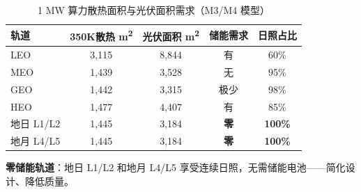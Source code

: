 \begin{table}[H]
\centering
\caption{1 MW 算力散热面积与光伏面积需求（M3/M4 模型）}
\label{tab:area-requirement}
\small
\begin{tabular}{@{}lcccc@{}}
\toprule
\textbf{轨道} & \textbf{350K散热 m\textsuperscript{2}} & \textbf{光伏面积 m\textsuperscript{2}} & \textbf{储能需求} & \textbf{日照占比} \\
\midrule
LEO       & 3,115 & 8,844 & 有 & 60\%   \\
MEO       & 1,439 & 3,528 & 无 & 95\%   \\
GEO       & 1,442 & 3,315 & 极少 & 98\%   \\
HEO       & 1,477 & 4,407 & 有 & 85\%   \\
地日 L1/L2 & 1,445 & 3,184 & \textbf{零} & \textbf{100\%} \\
地月 L4/L5 & 1,445 & 3,184 & \textbf{零} & \textbf{100\%} \\
\bottomrule
\end{tabular}
\end{table}

\textbf{零储能轨道}：地日 L1/L2 和地月 L4/L5 享受连续日照，无需储能电池——简化设计、降低质量。
